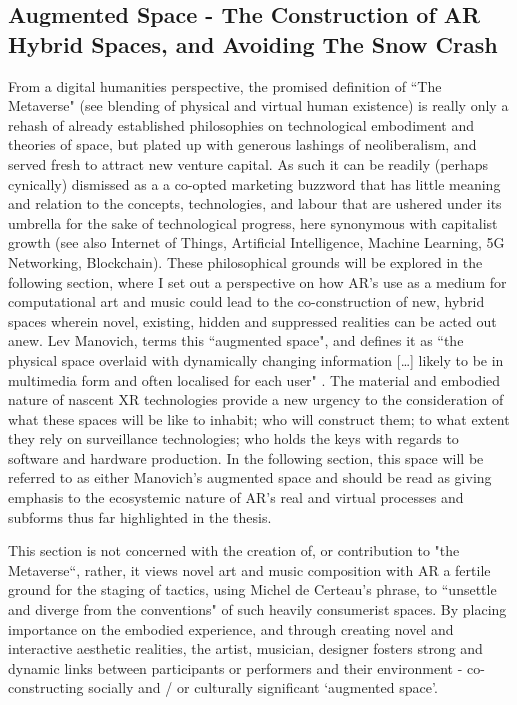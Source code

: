 \subsection[Augmented Space]{Augmented Space - The Construction of AR Hybrid Spaces, and Avoiding The Snow Crash} \label{sec: discussion-medium-space}
From a digital humanities perspective, the promised definition of ``The Metaverse" (see blending of physical and virtual human existence) is really only a rehash of already established philosophies on technological embodiment and theories of space, but plated up with generous lashings of neoliberalism, and served fresh to attract new venture capital. As such it can be readily (perhaps cynically) dismissed as a a co-opted marketing buzzword that has little meaning and relation to the concepts, technologies, and labour that are ushered under its umbrella for the sake of technological progress, here synonymous with capitalist growth (see also Internet of Things, Artificial Intelligence, Machine Learning, 5G Networking, Blockchain). These philosophical grounds will be explored in the following section, where I set out a perspective on how AR's use as a medium for computational art and music could lead to the co-construction of new, hybrid spaces wherein novel, existing, hidden and suppressed realities can be acted out anew. Lev Manovich, terms this ``augmented space", and defines it as ``the physical space overlaid with dynamically changing information […] likely to be in multimedia form and often localised for each user" \citep[p. 2]{manovich2006}. The material and embodied nature of nascent XR technologies provide a new urgency to the consideration of what these spaces will be like to inhabit; who will construct them; to what extent they rely on surveillance technologies; who holds the keys with regards to software and hardware production. In the following section, this space will be referred to as either Manovich's augmented space and should be read as giving emphasis to the ecosystemic nature of AR's real and virtual processes and subforms thus far highlighted in the thesis.  

This section is not concerned with the creation of, or contribution to "the Metaverse``, rather, it views novel art and music composition with AR a fertile ground for the staging of tactics, using Michel de Certeau's phrase, to ``unsettle and diverge from the conventions" \citeyearpar[p. 36]{decerteau1984} of such heavily consumerist spaces. By placing importance on the embodied experience, and through creating novel and interactive aesthetic realities, the artist, musician, designer fosters strong and dynamic links between participants or performers and their environment - co-constructing socially and / or culturally significant `augmented space'.

